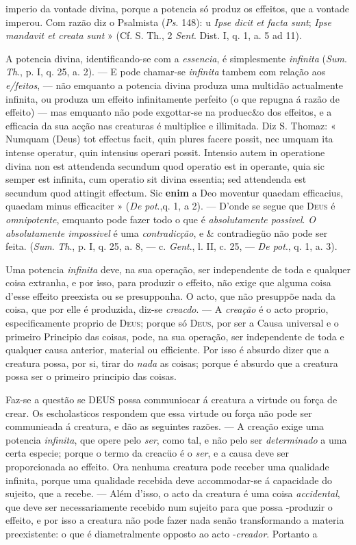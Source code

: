 imperio da vontade divina, porque a potencia só produz os effeitos, que a vontade imperou. Com razão diz o Psalmista (\emph{Ps}. 148): u \emph{Ipse dicit et facta sunt}; \emph{Ipse mandavit et creata sunt} » (Cf. S. Th., 2 \emph{Sent}. Dist. I, q. 1, a. 5 ad 11).\par A potencia divina, identificando-se com a \emph{essencia}, é simplesmente \emph{infinita} (\emph{Sum}. \emph{Th}., p. I, q. 25, a. 2). --- E pode chamar-se \emph{infinita} tambem com relação aos \emph{e/feitos}, --- não emquanto a potencia divina produza uma multidão actualmente infinita, ou produza um effeito infinitamente perfeito (o que repugna á razão de effeito) --- mas emquanto não pode exgottar-se na produec\&o dos effeitos, e a efficacia da sua acção nas creaturas é multiplice e illimitada. Diz S. Thomaz: « Numquam (Deus) tot effectus facit, quin plures facere possit, nec umquam ita intense operatur, quin intensius operari possit. Intensio autem in operatione divina non est attendenda secundum quod operatio est in operante, quia sic semper est infinita, cum operatio sit divina essentia; sed attendenda est secundum quod attingit effectum. Sic \textbf{enim} a Deo moventur quaedam efficacius, quaedam minus efficaciter » (\emph{De pot}.,q. 1, a 2). --- D'onde se segue que \textsc{Deus} é \emph{omnipotente}, emquanto pode fazer todo o que é \emph{absolutamente possivel}. \emph{O absolutamente impossivel} é uma \emph{contradicção}, e \& contradiegüo não pode ser feita. (\emph{Sum}. \emph{Th}., p. I, q. 25, a. 8, --- c. \emph{Gent}., l. II, c. 25, --- \emph{De pot}., q. 1, a. 3).\par Uma potencia \emph{infinita} deve, na sua operação, ser independente de toda e qualquer coisa extranha, e por isso, para produzir o effeito, não exige que alguma coisa d'esse effeito preexista ou se presupponha. O acto, que não presuppõe nada da coisa, que por elle é produzida, diz-se \emph{creacdo}. --- A \emph{creação} é o acto proprio, especificamente proprio de \textsc{Deus}; porque só \textsc{Deus}, por ser a Causa universal e o primeiro Principio das coisas, pode, na sua operação, ser independente de toda e qualquer causa anterior, material ou efficiente. Por isso é absurdo dizer que a creatura possa, por si, tirar do \emph{nada} as coisas; porque é absurdo que a creatura possa ser o primeiro principio das coisas.\par Faz-se a questão se \textsc{DEUS} possa communiocar á creatura a virtude ou força de crear. Os escholasticos respondem que essa virtude ou força não pode ser communieada á creatura, e dão as seguintes razões. --- A creação exige uma potencia \emph{infinita}, que opere pelo \emph{ser}, como tal, e não pelo ser \emph{determinado} a uma certa especie; porque o termo da creacüo é o \emph{ser}, e a causa deve ser proporcionada ao effeito. Ora nenhuma creatura pode receber uma qualidade infinita, porque uma qualidade recebida deve accommodar-se á capacidade do sujeito, que a recebe. --- Além d'isso, o acto da creatura é uma coisa \emph{accidental}, que deve ser necessariamente recebido num sujeito para que possa -produzir o effeito, e por isso a creatura não pode fazer nada senão transformando a materia preexistente: o que é diametralmente opposto ao acto -\emph{creador}. Portanto a 